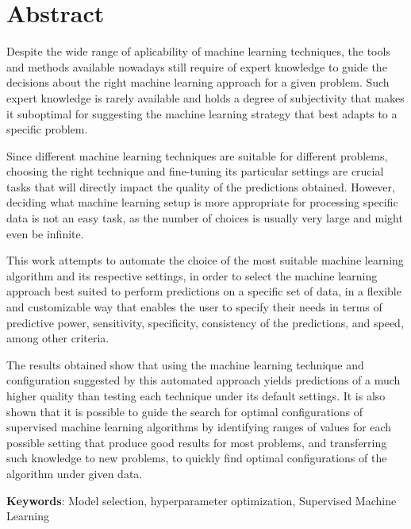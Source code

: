 \cleardoublepage
\chapter*{Abstract}

Despite the wide range of aplicability of machine learning techniques, the tools and methods 
available nowadays still require of expert knowledge to guide the decisions about the right machine
learning approach for a given problem. Such expert knowledge is rarely available and holds a degree
of subjectivity that makes it suboptimal for suggesting the machine learning strategy that best
adapts to a specific problem.

\vskip0.2cm
Since different machine learning techniques are suitable for different problems, choosing the right
technique and fine-tuning its particular settings are crucial tasks that will directly impact the
quality of the predictions obtained. However, deciding what machine learning setup is more
appropriate for processing specific data is not an easy task, as the number of choices is usually very
large and might even be infinite.

\vskip0.2cm
This work attempts to automate the choice of the most suitable machine learning algorithm and its
respective settings, in order to select the machine learning approach best suited to perform
predictions on a specific set of data, in a flexible and customizable way that enables the user to
specify their needs in terms of predictive power, sensitivity, specificity, consistency of the
predictions, and speed, among other criteria.

\vskip0.2cm
The results obtained show that using the machine learning technique and configuration suggested by
this automated approach yields predictions of a much higher quality than testing each technique
under its default settings. It is also shown that it is possible to guide the search for optimal
configurations of supervised machine learning algorithms by identifying ranges of values for each
possible setting that produce good results for most problems, and transferring such knowledge to new
problems, to quickly find optimal configurations of the algorithm under given data.

\vskip0.5cm
{\bf Keywords}:
Model selection, hyperparameter optimization, Supervised Machine Learning
